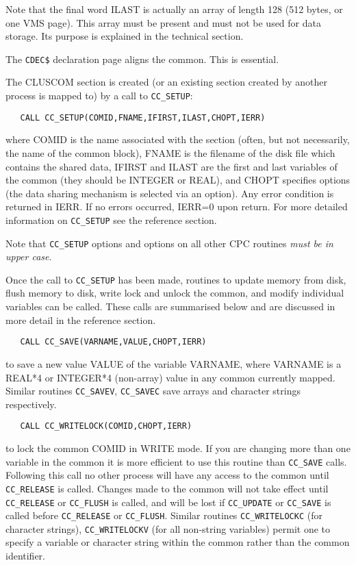 Note that the final word ILAST is actually an array of length 128
(512 bytes, or one VMS page). This array must be present and must
not be used for data storage. Its purpose is explained in the
technical section.

The \verb|CDEC$| declaration page aligns the common. This is essential.

The CLUSCOM section is created (or an existing section created by
another process is mapped to) by a call to \verb|CC_SETUP|:

\begin{verbatim}
   CALL CC_SETUP(COMID,FNAME,IFIRST,ILAST,CHOPT,IERR)
\end{verbatim}

\noindent
where COMID is the name associated with the section (often, but not
necessarily, the name of the common block), FNAME is the filename
of the disk file which contains the shared data, IFIRST and
ILAST are the first and last variables of the common (they should
be INTEGER or REAL), and CHOPT specifies options (\eg the data sharing
mechanism is selected via an option). Any error condition
is returned in IERR. If no errors occurred, IERR=0 upon return.
For more detailed information on \verb|CC_SETUP| see the reference section.

Note that \verb|CC_SETUP| options and options on all other CPC routines
{\em must be in upper case}.

Once the call to \verb|CC_SETUP| has been made, routines to update memory from
disk, flush memory to disk, write lock and unlock the common, and
modify individual variables can be called. These calls are summarised
below and are discussed in more detail in the reference section.

\begin{verbatim}
   CALL CC_SAVE(VARNAME,VALUE,CHOPT,IERR)
\end{verbatim}
   to save a new value VALUE of the variable VARNAME, where
   VARNAME is a REAL*4 or INTEGER*4 (non-array) value in any
   common currently mapped. Similar routines \verb|CC_SAVEV|,
   \verb|CC_SAVEC| save arrays and character strings respectively.

\begin{verbatim}
   CALL CC_WRITELOCK(COMID,CHOPT,IERR)
\end{verbatim}
   to lock the common COMID in WRITE mode. If you are changing
   more than one variable in the common it is more efficient
   to use this routine than \verb|CC_SAVE| calls.
   Following this call no other process will have any access to
   the common until \verb|CC_RELEASE| is called. Changes made to the
   common will not take effect until \verb|CC_RELEASE|
   or \verb|CC_FLUSH| is
   called, and will be lost if \verb|CC_UPDATE|
   or \verb|CC_SAVE| is called
   before \verb|CC_RELEASE| or \verb|CC_FLUSH|.
   Similar routines \verb|CC_WRITELOCKC| (for character strings),
   \verb|CC_WRITELOCKV| (for all non-string variables) permit one to
   specify a variable or character string within the common
   rather than the common identifier.


